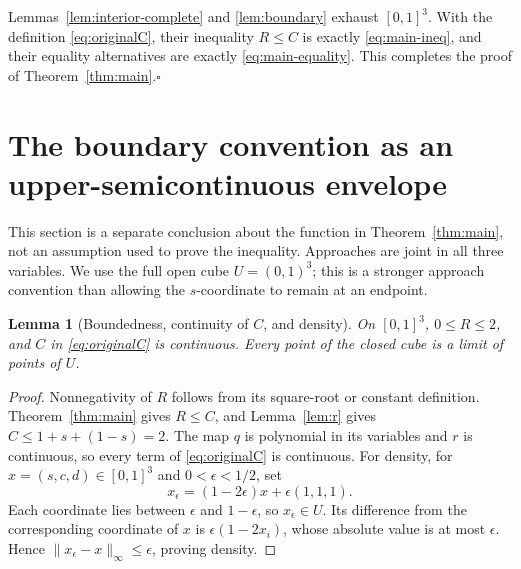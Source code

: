 \documentclass[11pt,a4paper]{article}
\newtheorem{lemma}{Lemma}[section]
\theoremstyle{definition}
\newcommand{\E}[2]{\refstepcounter{equation}\[#2\tag{\theequation}\label{eq:#1}\]}
\begin{document}
Lemmas~\ref{lem:interior-complete} and \ref{lem:boundary} exhaust $[0,1]^3$. With the definition \eqref{eq:originalC}, their inequality $R\leq C$ is exactly \eqref{eq:main-ineq}, and their equality alternatives are exactly \eqref{eq:main-equality}. This completes the proof of Theorem~\ref{thm:main}.\hfill$\square$

\section{The boundary convention as an upper-semicontinuous envelope}
This section is a separate conclusion about the function in Theorem~\ref{thm:main}, not an assumption used to prove the inequality. Approaches are joint in all three variables. We use the full open cube $U=(0,1)^3$; this is a stronger approach convention than allowing the $s$-coordinate to remain at an endpoint.

\begin{lemma}[Boundedness, continuity of $C$, and density]\label{lem:envelope-basic}
On $[0,1]^3$, $0\leq R\leq2$, and $C$ in \eqref{eq:originalC} is continuous. Every point of the closed cube is a limit of points of $U$.
\end{lemma}
\begin{proof}
Nonnegativity of $R$ follows from its square-root or constant definition. Theorem~\ref{thm:main} gives $R\leq C$, and Lemma~\ref{lem:r} gives $C\leq1+s+(1-s)=2$.
The map $q$ is polynomial in its variables and $r$ is continuous, so every term of \eqref{eq:originalC} is continuous. For density, for $x=(s,c,d)\in[0,1]^3$ and $0<\epsilon<1/2$, set
\E{density-sequence}{x_\epsilon=(1-2\epsilon)x+\epsilon(1,1,1).}
Each coordinate lies between $\epsilon$ and $1-\epsilon$, so $x_\epsilon\in U$. Its difference from the corresponding coordinate of $x$ is $\epsilon(1-2x_i)$, whose absolute value is at most $\epsilon$. Hence $\|x_\epsilon-x\|_\infty\leq\epsilon$, proving density.
\end{proof}
\end{document}
